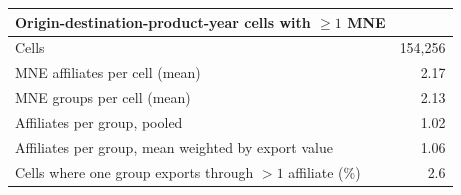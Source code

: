 \begin{tabular}{lr}
\toprule
Origin-destination-product-year cells with $\geq 1$ MNE & \\
\midrule
Cells & 154,256 \\
MNE affiliates per cell (mean) & 2.17 \\
MNE groups per cell (mean) & 2.13 \\
Affiliates per group, pooled & 1.02 \\
Affiliates per group, mean weighted by export value & 1.06 \\
Cells where one group exports through $>1$ affiliate (\%) & 2.6 \\
\bottomrule
\end{tabular}
